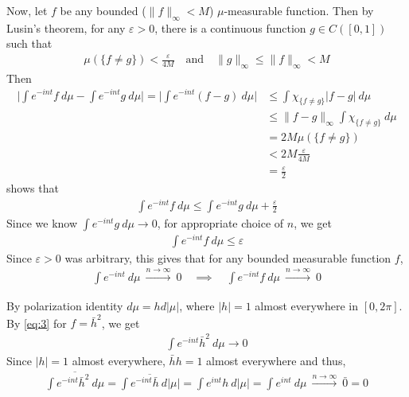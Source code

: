 \documentclass[12pt]{exam}
\theoremstyle{plain} %
\theoremstyle{definition} %
\theoremstyle{remark} %
\begin{document}
\begin{questions}
\begin{solution}
    Now, let $f$ be any bounded ($\|f\|_\infty < M$) $\mu$-measurable
    function.  Then by
    Lusin's theorem, for any $\varepsilon > 0$, there is a continuous
    function $g \in C([0, 1])$ such that
    \begin{align*}
      \mu(\{ f \neq g \}) < \frac{\varepsilon}{4 M}
      \quad \textrm{and} \quad \|g\|_\infty \le \|f\|_\infty < M
    \end{align*}
    Then
    \begin{align*}
      \Big|\int e^{-int} f \ d \mu - \int  e^{-int} g \ d \mu\Big| =
      \Big|\int e^{-int}(f - g)\ d \mu\Big| &\le \int \chi_{\{ f \neq
      g \}}|f - g| \ d \mu \\
      &\le \|f - g\|_\infty  \int \chi_{\{ f \neq g \}} \ d \mu \\
      &= 2M \mu(\{ f \neq g \}) \\
      &< 2M \frac{\varepsilon}{4M} \\
      &= \frac{\varepsilon}{2}
    \end{align*}
    shows that
    \begin{align*}
      \int e^{-int} f \ d \mu \le \int  e^{-int} g \ d \mu +
      \frac{\varepsilon}{2}
    \end{align*}
    Since we know $\int e^{-int} g \ d \mu \to 0$, for appropriate
    choice of $n$, we get
    \begin{align*}
      \int e^{-int} f \ d \mu \le \varepsilon
    \end{align*}
    Since $\varepsilon > 0$ was arbitrary, this gives that for any
    bounded measurable function $f$,
    \begin{align}
      \label{eq:3}
      \int e^{-int} \ d \mu \ \stackrel{ n \to
      \infty}{\longrightarrow} \ 0 \quad \implies \quad
      \int e^{-int} f \ d \mu \ \stackrel{ n \to \infty}{\longrightarrow} \ 0
    \end{align}

    By polarization identity $d \mu = h d |\mu|$, where $|h| = 1$
    almost everywhere in $[0, 2 \pi]$.
    By \autoref{eq:3} for $f = \bar{h}^2$, we get
    \begin{align*}
      \int e^{-int} \bar{h}^2 \ d \mu \to 0
    \end{align*}
    Since $|h| = 1$ almost everywhere, $\bar{h}h = 1$ almost
    everywhere and thus,
    \begin{align*}
      \overline{\int e^{-int} \bar{h}^2 \ d \mu} = \overline{ \int
        e^{-int} \bar{h}
      \ d |\mu|} = \int e^{int}h \ d |\mu| = \int e^{int} \ d \mu \
      \stackrel{n\to \infty}{\longrightarrow} \ \bar{0} = 0
    \end{align*}

  \end{solution}

\end{questions}
\printbibliography[heading=bibintoc]
\end{document}
